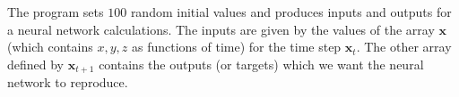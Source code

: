 \documentclass[%
oneside,                 %
final,                   %
10pt]{article}
\begin{document}
The program sets $100$ random initial values and produces inputs and outputs for a neural network calculations.
The inputs are given by the values of the array $\bm{x}$ (which contains $x,y,z$ as functions of time) for the time step $\bm{x}_t$.
The other array defined by $\bm{x}_{t+1}$ contains the outputs (or targets) which we want the neural network to reproduce.
\end{document}
